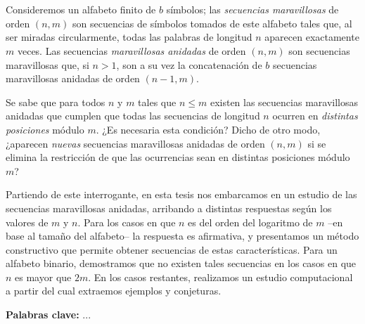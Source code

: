 \chapter*{\runtitulo}

Consideremos un alfabeto finito de $b$ símbolos; las \emph{secuencias maravillosas}
de orden $(n,m)$ son secuencias de símbolos tomados de este alfabeto
tales que, al ser miradas circularmente, todas las
palabras de longitud $n$ aparecen exactamente $m$ veces.
Las secuencias \emph{maravillosas anidadas} de orden $(n,m)$ son secuencias
maravillosas que, si $n > 1$, son a su vez la concatenación de $b$ secuencias
maravillosas anidadas de orden $(n-1, m)$.

Se sabe que para todos $n$ y $m$ tales que $n \leq m$ existen las secuencias
maravillosas anidadas que cumplen que todas las secuencias de longitud $n$
ocurren en \emph{distintas posiciones} módulo $m$.
¿Es necesaria esta condición? Dicho de otro modo, ¿aparecen \emph{nuevas} secuencias
maravillosas anidadas de orden $(n,m)$ si se elimina la restricción de que las
ocurrencias sean en distintas posiciones módulo $m$?

Partiendo de este interrogante, en esta tesis nos embarcamos en un estudio de
las secuencias maravillosas anidadas, arribando a distintas respuestas según los
valores de $m$ y $n$. Para los casos en que $n$ es del orden del logaritmo de
$m$ --en base al tamaño del alfabeto-- la respuesta es afirmativa, y presentamos
un método constructivo que permite obtener secuencias de estas características.
Para un alfabeto binario, demostramos que no existen tales secuencias en
los casos en que $n$ es mayor que $2m$.
En los casos restantes, realizamos un estudio computacional a partir
del cual extraemos ejemplos y conjeturas.

\bigskip

\noindent\textbf{Palabras clave:} ...

